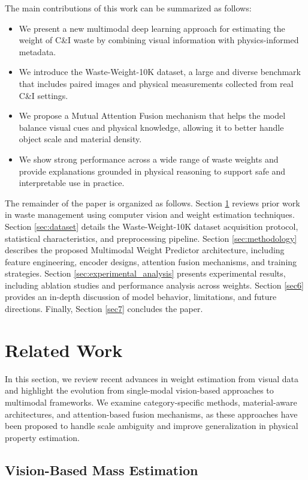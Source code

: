 \documentclass[journal,twoside,web]{ieeecolor}
\begin{document}
The main contributions of this work can be summarized as follows:
\begin{itemize}
    \item We present a new multimodal deep learning approach for estimating the weight of C\&I waste by combining visual information with physics-informed metadata.
    \item We introduce the Waste-Weight-10K dataset, a large and diverse benchmark that includes paired images and physical measurements collected from real C\&I settings.
    \item We propose a Mutual Attention Fusion mechanism that helps the model balance visual cues and physical knowledge, allowing it to better handle object scale and material density.
    \item We show strong performance across a wide range of waste weights and provide explanations grounded in physical reasoning to support safe and interpretable use in practice.
\end{itemize}


The remainder of the paper is organized as follows. Section \ref{sec2} reviews prior work in waste management using computer vision and weight estimation techniques. Section \ref{sec:dataset} details the Waste-Weight-10K dataset acquisition protocol, statistical characteristics, and preprocessing pipeline. Section \ref{sec:methodology} describes the proposed Multimodal Weight Predictor architecture, including feature engineering, encoder designs, attention fusion mechanisms, and training strategies. Section \ref{sec:experimental_analysis} presents experimental results, including ablation studies and performance analysis across weights. Section \ref{sec6} provides an in-depth discussion of model behavior, limitations, and future directions. Finally, Section \ref{sec7} concludes the paper.

\section{Related Work}
\label{sec2}
In this section, we review recent advances in weight estimation from visual data and highlight the evolution from single-modal vision-based approaches to multimodal frameworks. We examine category-specific methods, material-aware architectures, and attention-based fusion mechanisms, as these approaches have been proposed to handle scale ambiguity and improve generalization in physical property estimation.

\subsection{Vision-Based Mass Estimation}
\end{document}
